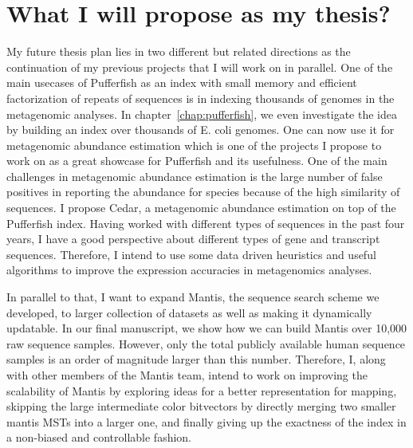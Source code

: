 \section{What I will propose as my thesis?}
My future thesis plan lies in two different but related directions
as the continuation of my previous projects that I will work on in parallel.
One of the main usecases of Pufferfish as an index with small memory
and efficient factorization of repeats of sequences is in indexing thousands of genomes
in the metagenomic analyses. In chapter~\ref{chap:pufferfish}, we even investigate
the idea by building an index over thousands of E. coli genomes.
One can now use it for metagenomic abundance estimation which is one of the projects
I propose to work on as a great showcase for Pufferfish and its usefulness.
One of the main challenges in metagenomic abundance estimation is the large number of false positives
in reporting the abundance for species because of the high similarity of sequences.
I propose Cedar, a metagenomic abundance estimation on top of the Pufferfish index.
Having worked with different types of sequences in the past four years,
I have a good perspective about different types of gene and transcript sequences.
Therefore, I intend to use some data driven heuristics and useful algorithms to
improve the expression accuracies in metagenomics analyses.

In parallel to that, I want to expand Mantis, the sequence search scheme we developed,
to larger collection of datasets as well as making it dynamically updatable.
In our final manuscript, we show how we can build Mantis over 10,000 raw sequence samples.
However, only the total publicly available human sequence samples is an order of magnitude larger
than this number. Therefore, I, along with other members of the Mantis team,
intend to work on improving the scalability of Mantis
by exploring ideas for a better representation for \kmer mapping, skipping the
large intermediate color bitvectors by directly merging two smaller mantis MSTs into a larger one,
and finally giving up the exactness of the index in a non-biased and controllable fashion.


